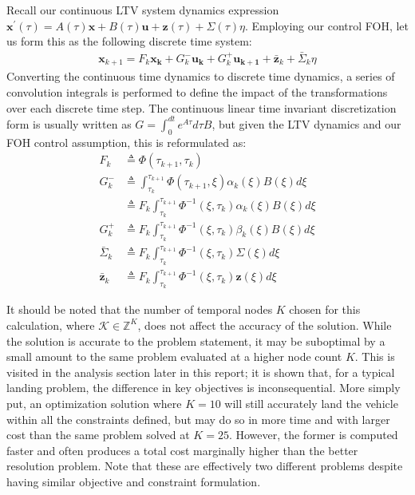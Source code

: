 Recall our continuous LTV system dynamics expression $\mathbf{x}^\prime(\tau) =  A(\tau)\mathbf{x} + B(\tau)\mathbf{u} + \mathbf{z}(\tau) + \Sigma(\tau)\eta$. Employing our control FOH, let us form this as the following discrete time system:
\begin{align}
	\mathbf{x}_{k+1} = F_k\mathbf{x_k} + G^-_k\mathbf{u_k} + G^+_k\mathbf{u_{k+1}} + \bar{\mathbf{z}}_k + \bar{\Sigma}_k\eta
\end{align}
Converting the continuous time dynamics to discrete time dynamics, a series of convolution integrals is performed to define the impact of the transformations over each discrete time step. The continuous linear time invariant discretization form is usually written as $G=\int_{0}^{dt} e^{A \tau} d \tau B$, but given the LTV dynamics and our FOH control assumption, this is reformulated as:
%
\begin{subequations}
\label{disc}
 \begin{align}
 F_k &\triangleq  \Phi(\tau_{k+1},\tau_k)\\
 G^-_k &\triangleq \int_{\tau_k}^{\tau_{k+1}}  \Phi(\tau_{k+1},\xi) \alpha_k(\xi)B(\xi) d\xi\\
 &\triangleq F_k \int_{\tau_k}^{\tau_{k+1}}  \Phi^{-1}(\xi,\tau_{k}) \alpha_k(\xi)B(\xi) d\xi\\
 G^+_k &\triangleq F_k \int_{\tau_k}^{\tau_{k+1}}  \Phi^{-1}(\xi,\tau_{k}) \beta_k(\xi)B(\xi) d\xi\\
 \bar{\Sigma}_k &\triangleq  F_k \int_{\tau_k}^{\tau_{k+1}} \Phi^{-1}(\xi,\tau_{k}) \Sigma(\xi) d\xi\\
 \bar{\mathbf{z}}_k &\triangleq F_k \int_{\tau_k}^{\tau_{k+1}} \Phi^{-1}(\xi,\tau_{k}) \mathbf{z}(\xi) d\xi
\end{align}
\end{subequations}

It should be noted that the number of temporal nodes $K$ chosen for this calculation, where $\mathcal{K} \in \mathbb{Z}^K$, does not affect the accuracy of the solution. While the solution is accurate to the problem statement, it may be suboptimal by a small amount to the same problem evaluated at a higher node count $K$. This is visited in the analysis section later in this report; it is shown that, for a typical landing problem, the difference in key objectives is inconsequential. More simply put, an optimization solution where $K=10$ will still accurately land the vehicle within all the constraints defined, but may do so in more time and with larger cost than the same problem solved at $K=25$. However, the former is computed faster and often produces a total cost marginally higher than the better resolution problem. Note that these are effectively two different problems despite having similar objective and constraint formulation.


